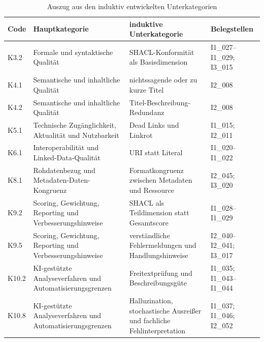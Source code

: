 \begin{table}[H]
\centering
\scriptsize
\renewcommand{\arraystretch}{1.1}
\begin{tabularx}{\textwidth}{p{1.4cm} p{4.2cm} X p{3cm}}
\toprule
\textbf{Code} & \textbf{Hauptkategorie} & \textbf{induktive Unterkategorie} & \textbf{Belegstellen} \\
\midrule

K3.2 & Formale und syntaktische Qualität 
& SHACL-Konformität als Basisdimension 
& I1\_027--I1\_029; I3\_015 \\ \hline

K4.1 & Semantische und inhaltliche Qualität 
& nichtssagende oder zu kurze Titel 
& I2\_008 \\ \hline

K4.2 & Semantische und inhaltliche Qualität 
& Titel-Beschreibung-Redundanz 
& I2\_008 \\ \hline

K5.1 & Technische Zugänglichkeit, Aktualität und Nutzbarkeit 
& Dead Links und Linkrot 
& I1\_015; I2\_011 \\ \hline

K6.1 & Interoperabilität und Linked-Data-Qualität 
& URI statt Literal 
& I1\_020--I1\_022 \\ \hline

K8.1 & Rohdatenbezug und Metadaten-Daten-Kongruenz 
& Formatkongruenz zwischen Metadaten und Ressource 
& I2\_045; I3\_020 \\ \hline

K9.2 & Scoring, Gewichtung, Reporting und Verbesserungshinweise 
& SHACL als Teildimension statt Gesamtscore 
& I1\_028--I1\_029 \\ \hline

K9.5 & Scoring, Gewichtung, Reporting und Verbesserungshinweise 
& verständliche Fehlermeldungen und Handlungshinweise 
& I2\_040--I2\_041; I3\_017 \\ \hline

K10.2 & KI-gestützte Analyseverfahren und Automatisierungsgrenzen 
& Freitextprüfung und Beschreibungsgüte 
& I1\_035; I1\_043--I1\_044 \\ \hline

K10.8 & KI-gestützte Analyseverfahren und Automatisierungsgrenzen 
& Halluzination, stochastische Ausreißer und fachliche Fehlinterpretation 
& I1\_037; I1\_046; I2\_052 \\

\bottomrule
\end{tabularx}
\caption{Auszug aus den induktiv entwickelten Unterkategorien}
\label{tab:unterkategorien_auszug}
\end{table}

